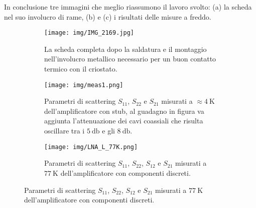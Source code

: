 \documentclass[12pt]{article}
\begin{document}
In conclusione tre immagini che meglio riassumono il lavoro svolto: (a) la scheda nel suo involucro di rame, (b) e (c) i risultati delle misure a freddo.
\begin{figure}[H]
    \centering
    \begin{subfigure}[t]{0.3\textwidth}
        \centering
        \texttt{[image: img/IMG\_2169.jpg]}
        \caption{La scheda completa dopo la saldatura e il montaggio nell'involucro metallico necessario per un buon contatto termico con il criostato.}
    \end{subfigure}
    \hfill
    \begin{subfigure}[t]{0.33\textwidth}
        \centering
        \texttt{[image: img/meas1.png]}
        \caption{Parametri di scattering $S_{11}$, $S_{22}$ e $S_{21}$ misurati a $\approx\SI{4}{\kelvin}$ dell'amplificatore con stub, al guadagno in figura va aggiunta l'attenuazione dei cavi coassiali che risulta oscillare tra i $\SI{5}{\decibel}$ e gli $\SI{8}{\decibel}$.}
    \end{subfigure}
    \hfill
    \begin{subfigure}[t]{0.33\textwidth}
        \centering
        \texttt{[image: img/LNA\_L\_77K.png]}
        \caption{Parametri di scattering $S_{11}$, $S_{22}$, $S_{12}$ e $S_{21}$ misurati a $\SI{77}{\kelvin}$ dell'amplificatore con componenti discreti.}
    \end{subfigure}
\end{figure}
\end{document}
